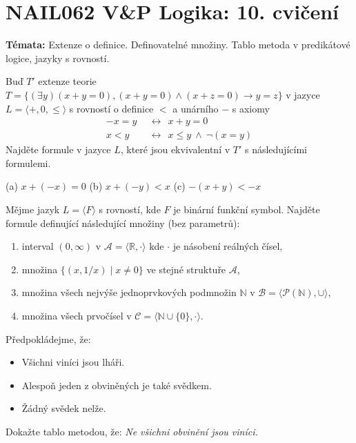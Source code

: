 \documentclass[a4paper,12pt]{article}
\begin{document}
\section*{NAIL062 V\&P Logika: 10. cvičení}


\textbf{Témata:}
Extenze o definice. Definovatelné množiny. Tablo metoda v predikátové logice, jazyky s rovností.


\medskip\begin{problem}
Buď $T'$ extenze teorie $T=\{(\exists y)(x+y=0),(x+y=0)\wedge (x+z=0)\rightarrow y=z\}$ v jazyce $L=\langle +,0,\le\rangle$ s rovností o definice $<$ a unárního $-$ s axiomy
\begin{align*}
    -x=y\ \ &\leftrightarrow\ \ x+y=0\\
    x<y\ \ &\leftrightarrow\ \ x\le y\ \wedge\ \neg(x=y)
\end{align*}
Najděte formule v jazyce $L$, které jsou ekvivalentní v $T'$ s následujícími formulemi.
\medskip

(a) $x+(-x)=0$ \hfill (b) $x+(-y)<x$ \hfill (c) $-(x+y)<-x$\hfill{}

\end{problem}


\medskip\begin{problem}
    Mějme jazyk $L=\langle F \rangle$ s rovností, kde $F$ je binární funkční symbol. Najděte formule definující následující množiny (bez parametrů):
    \begin{enumerate}
        \item interval $(0,\infty)$ v $\mathcal A=\langle\mathbb R, \cdot\rangle$ kde $\cdot$ je násobení reálných čísel,
        \item množina $\{(x, 1/x)\mid x\neq 0\}$ ve stejné struktuře $\mathcal A$,
        \item množina všech nejvýše jednoprvkových podmnožin $\mathbb N$ v $\mathcal B=\langle\mathcal P(\mathbb N),\cup\rangle$,
        \item množina všech prvočísel v $\mathcal C=\langle \mathbb N\cup\{0\}, \cdot\rangle$.
    \end{enumerate}
\end{problem}





\medskip\begin{problem}
    Předpokládejme, že:
    \begin{itemize}\it
    \item Všichni viníci jsou lháři.
    \item Alespoň jeden z obviněných je také svědkem.
    \item Žádný svědek nelže.
    \end{itemize}
    Dokažte tablo metodou, že: {\it Ne všichni obvinění jsou viníci.}
\end{problem} 
    
\end{document}
